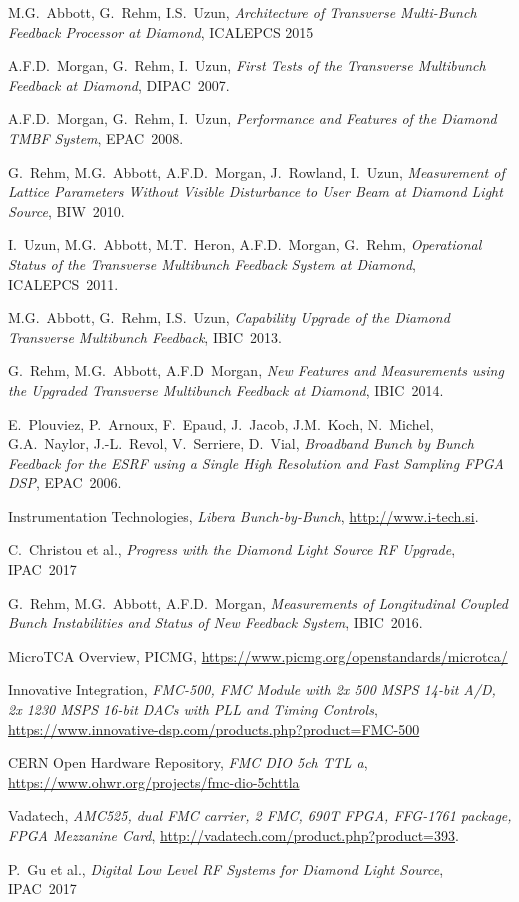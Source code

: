 \documentclass[
    a4paper,
    keeplastbox,            %
    hyphens,                %
    boxit,                  %
]{jacow}
\begin{document}
\begin{thebibliography}{99}

M.G.~Abbott, G.~Rehm, I.S.~Uzun,
\emph{Architecture of Transverse Multi-Bunch Feedback Processor at Diamond},
ICALEPCS 2015

A.F.D.~Morgan, G.~Rehm, I.~Uzun, \emph{First Tests of the Transverse Multibunch
Feedback at Diamond}, DIPAC~2007.

A.F.D.~Morgan, G.~Rehm, I.~Uzun, \emph{Performance and Features of the Diamond
TMBF System}, EPAC~2008.

G.~Rehm, M.G.~Abbott, A.F.D.~Morgan, J.~Rowland, I.~Uzun, \emph{Measurement of
Lattice Parameters Without Visible Disturbance to User Beam at Diamond Light
Source}, BIW~2010.

I.~Uzun, M.G.~Abbott, M.T.~Heron, A.F.D.~Morgan, G.~Rehm, \emph{Operational
Status of the Transverse Multibunch Feedback System at Diamond}, ICALEPCS~2011.

M.G.~Abbott, G.~Rehm, I.S.~Uzun, \emph{Capability Upgrade of the Diamond
Transverse Multibunch Feedback}, IBIC~2013.

G.~Rehm, M.G.~Abbott, A.F.D~Morgan, \emph{New Features and Measurements using
the Upgraded Transverse Multibunch Feedback at Diamond}, IBIC~2014.

E.~Plouviez, P.~Arnoux, F.~Epaud, J.~Jacob, J.M.~Koch, N.~Michel, G.A.~Naylor,
J.\mbox{-}L.~Revol, V.~Serriere, D.~Vial, \emph{Broadband Bunch by Bunch
Feedback for the ESRF using a Single High Resolution and Fast Sampling FPGA
DSP}, EPAC~2006.

Instrumentation Technologies, \emph{Libera Bunch-by-Bunch},
\url{http://www.i-tech.si}.

C.~Christou et al., \emph{Progress with the Diamond Light Source RF Upgrade},
IPAC~2017

G.~Rehm, M.G.~Abbott, A.F.D.~Morgan, \emph{Measurements of Longitudinal Coupled
Bunch Instabilities and Status of New Feedback System}, IBIC~2016.

MicroTCA Overview, PICMG, \url{https://www.picmg.org/openstandards/microtca/}

Innovative Integration, \emph{FMC-500, FMC Module with 2x 500 MSPS 14-bit A/D,
2x 1230 MSPS 16-bit DACs with PLL and Timing Controls},
\url{https://www.innovative-dsp.com/products.php?product=FMC-500}

CERN Open Hardware Repository, \emph{FMC DIO 5ch TTL a},
\url{https://www.ohwr.org/projects/fmc-dio-5chttla}

Vadatech, \emph{AMC525, dual FMC carrier, 2 FMC, 690T FPGA, FFG-1761 package,
FPGA Mezzanine Card}, \url{http://vadatech.com/product.php?product=393}.

P.~Gu et al., \emph{Digital Low Level RF Systems for Diamond Light Source},
IPAC~2017


\end{thebibliography}
\end{document}
